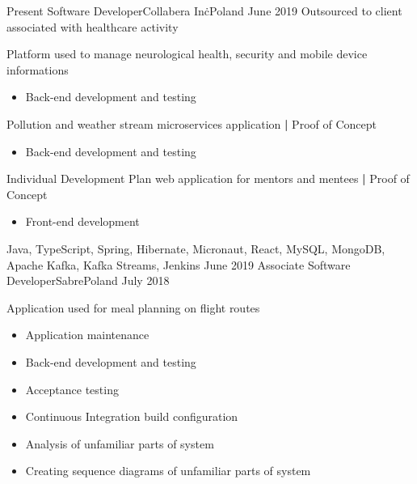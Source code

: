 
\begin{experiences}
  \contractorexperience
    {Present}   {Software Developer}{Collabera Inc\.}{Poland}
    {June 2019} {Outsourced to client associated with healthcare activity}
                {
                        Platform used to manage neurological health, security and mobile device informations
                        \begin{itemize}
                            \item Back-end development and testing      
                        \end{itemize}
                        Pollution and weather stream microservices application \textbf{|} \small{Proof of Concept}\normalsize
                        \begin{itemize}
                            \item Back-end development and testing  
                        \end{itemize}
                        Individual Development Plan web application for mentors and mentees \textbf{|} \small{Proof of Concept}\normalsize
                        \begin{itemize}
                            \item Front-end development
                        \end{itemize}
                    }
                    {Java, TypeScript, Spring, Hibernate, Micronaut, React, MySQL, MongoDB, Apache Kafka, Kafka Streams, Jenkins}
  \emptySeparator
  \experience
    {June 2019} {Associate Software Developer}{Sabre}{Poland}
    {July 2018}    {
                        Application used for meal planning on flight routes
                        \begin{itemize}
                            \item Application maintenance
                            \item Back-end development and testing
                            \item Acceptance testing
                            \item Continuous Integration build configuration
                            \item Analysis of unfamiliar parts of system
                            \item Creating sequence diagrams of unfamiliar parts of system  

\end{itemize}}
\end{experiences}

